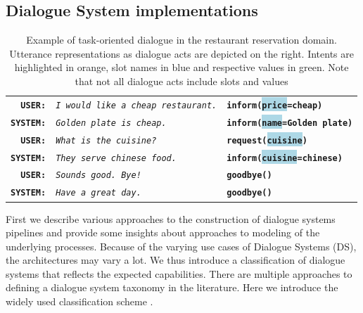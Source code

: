 \subsection{Dialogue System implementations}
\begin{table}[t]
\small
\setlength\fboxsep{2pt}
        \centering
        \begin{tabular}{rll}
        \textbf{\texttt{USER:}} & \textit{\texttt{I would like a cheap restaurant.}} & \textbf{\texttt{\colorbox{pastelyellow}{inform}(\colorbox{lightblue}{price}=\colorbox{pastelgreen}{cheap})}} \\
        \textbf{\texttt{SYSTEM:}} & \textit{\texttt{Golden plate is cheap.}} & \textbf{\texttt{\colorbox{pastelyellow}{inform}(\colorbox{lightblue}{name}=\colorbox{pastelgreen}{Golden plate})}} \\
        \hdashline[1.5pt/2pt]
        \textbf{\texttt{USER:}} & \textit{\texttt{What is the cuisine?}} & \textbf{\texttt{\colorbox{pastelyellow}{request}(\colorbox{lightblue}{cuisine})}} \\
        \textbf{\texttt{SYSTEM:}} & \textit{\texttt{They serve chinese food.}} & \textbf{\texttt{\colorbox{pastelyellow}{inform}(\colorbox{lightblue}{cuisine}=\colorbox{pastelgreen}{chinese})}} \\
        \hdashline[1.5pt/2pt]
        \textbf{\texttt{USER:}} & \textit{\texttt{Sounds good. Bye!}} & \textbf{\texttt{\colorbox{pastelyellow}{goodbye}()}} \\
        \textbf{\texttt{SYSTEM:}} & \textit{\texttt{Have a great day.}} & \textbf{\texttt{\colorbox{pastelyellow}{goodbye}()}} \\
        \end{tabular}
\normalsize
        \caption{Example of task-oriented dialogue in the restaurant reservation domain. Utterance representations as dialogue acts are depicted on the right. Intents are highlighted in orange, slot names in blue and respective values in green. Note that not all dialogue acts include slots and values}
    \label{fig:das}
\end{table}
First we describe various approaches to the construction of dialogue systems pipelines and provide some insights about approaches to modeling of the underlying processes.
Because of the varying use cases of Dialogue Systems (DS), the architectures may vary a lot.
We thus introduce a classification of dialogue systems that reflects the expected capabilities.
There are multiple approaches to defining a dialogue system taxonomy in the literature.
Here we introduce the widely used classification scheme \cite{jurafsky2000speech}.
